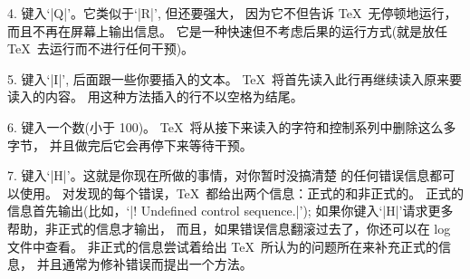 \smallbreak\item{4.} 键入`|Q|'。它类似于`|R|', 但还要强大，
因为它不但告诉 \TeX\ 无停顿地运行，而且不再在屏幕上输出信息。%
它是一种快速但不考虑后果的运行方式(就是放任 \TeX\ 去运行而不进行任何干预)。

\smallbreak\item{5.} 键入`|I|', 后面跟一些你要插入的文本。%
\TeX\ 将首先读入此行再继续读入原来要读入的内\hbox{容。}%
用这种方法插入的行不以空格为结尾。

\smallbreak\item{6.} \1键入一个数(小于 100)。%
\TeX\ 将从接下来读入的字符和控制系列中删除这么多字节，
并且做完后它会再停下来等待干预。

\smallbreak\item{7.} 键入`|H|'。这就是你现在所做的事情，对你暂时没搞清楚%
的任何错误信息都可以使用。%
对发现的每个错误，\TeX\ 都给出两个信息：正式的和非正式的。
正式的信息首先输出(比如，`|! Undefined
control sequence.|'\thinspace); 如果你键入`|H|'请求更多帮助，非正式的信息才输出，
而且，如果错误信息翻滚过去了，你还可以在 log 文件中查看。%
非正式的信息尝试着给出 \TeX\ 所认为的问题所在来补充正式的信息，
并且通常为修补错误而提出一个方法。

